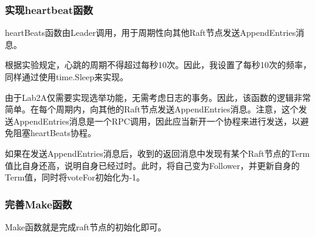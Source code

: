 \documentclass[]{article}
\begin{document}
	\subsubsection{实现heartbeat函数}
	heartBeats函数由Leader调用，用于周期性向其他Raft节点发送AppendEntries消息。
	
	根据实验规定，心跳的周期不得超过每秒10次。因此，我设置了每秒10次的频率，同样通过使用time.Sleep来实现。
	
	由于Lab2A仅需要实现选举功能，无需考虑日志的事务。因此，该函数的逻辑非常简单。在每个周期内，向其他的Raft节点发送AppendEntries消息。注意，这个发送AppendEntries消息是一个RPC调用，因此应当新开一个协程来进行发送，以避免阻塞heartBeats协程。
	
	如果在发送AppendEntries消息后，收到的返回消息中发现有某个Raft节点的Term值比自身还高，说明自身已经过时。此时，将自己变为Follower，并更新自身的Term值，同时将voteFor初始化为-1。
	
	\subsubsection{完善Make函数}
	Make函数就是完成raft节点的初始化即可。
	
\end{document}
